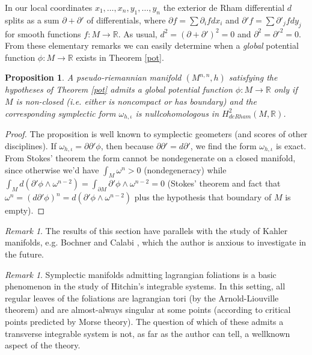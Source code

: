 \documentclass[12pt]{amsart}
\newtheorem{prop}[thm]{Proposition}
\theoremstyle{definition}
\theoremstyle{remark}
\newtheorem{rem}[thm]{Remark}
\newcommand{\bR}{\mathbb{R}}
\newcommand{\del}{\partial}
\begin{document}
In our local coordinates $x_1, \ldots, x_n, y_1, \ldots, y_n$ the exterior de Rham differential $d$ splits as a sum $\del+\del'$ of differentials, where $\del f = \sum \del_if dx_i$ and $\del' f = \sum \del'_j f dy_j$ for smooth functions $f: M \to \bR$. As usual, $d^2=(\del + \del')^2=0$ and $\del^2=\del'^2=0$. From these elementary remarks we can easily determine when a \emph{global} potential function $\phi: M \to \bR$ exists in Theorem \ref{pot}. 

\begin{prop}
A pseudo-riemannian manifold $(M^{n,n},h)$ satisfying the hypotheses of Theorem \ref{pot} admits a global potential function $\phi: M\to \bR$ only if $M$ is non-closed (i.e. either is noncompact or has boundary) and the corresponding symplectic form $\omega_{h, \iota}$ is nullcohomologous in $H^2_{deRham}(M, \bR)$.   
\end{prop}
\begin{proof}
The proposition is well known to symplectic geometers (and scores of other disciplines). If $\omega_{h,\iota}=\del \del' \phi$, then because $\del \del'= d\del'$, we find the form $\omega_{h,\iota}$ is exact. From Stokes' theorem the form cannot be nondegenerate on a closed manifold, since otherwise we'd have $\int_M \omega^n >0$ (nondegeneracy) while $\int_M d(\del' \phi \wedge \omega^{n-2})=\int_{\del M}\del' \phi \wedge \omega^{n-2}=0$ (Stokes' theorem and fact that $\omega^n=(d\del'\phi)^n=d(\del'\phi \wedge \omega^{n-2})$ plus the hypothesis that boundary of $M$ is empty).
\end{proof}

\begin{rem}
The results of this section have parallels with the study of Kahler manifolds, e.g. Bochner \cite{Boc} and Calabi \cite{Cal}, which the author is anxious to investigate in the future.  
\end{rem}



\begin{rem}

Symplectic manifolds admitting lagrangian foliations is a basic phenomenon in the study of Hitchin's integrable systems. In this setting, all regular leaves of the foliations are lagrangian tori (by the Arnold-Liouville theorem) and are almost-always singular at some points (according to critical points predicted by Morse theory). The question of which of these admits a transverse integrable system is not, as far as the author can tell, a wellknown aspect of the theory.  


\end{rem}
\end{document}
